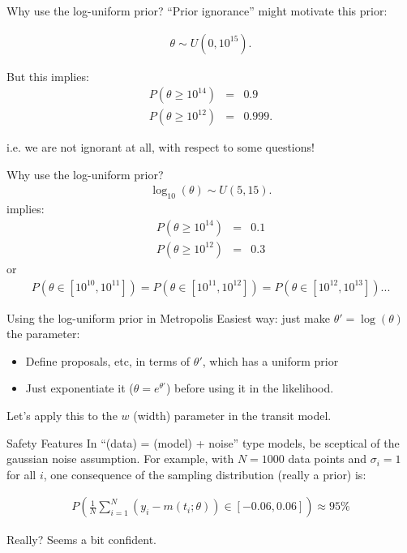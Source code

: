 \begin{frame}[t]{Why use the log-uniform prior?}
``Prior ignorance'' might motivate this prior:

\begin{eqnarray*}
\theta \sim U(0, 10^{15}).
\end{eqnarray*}

But this implies:
\begin{eqnarray*}
P(\theta \geq 10^{14}) &=& 0.9\\
P(\theta \geq 10^{12}) &=& 0.999.
\end{eqnarray*}

i.e. we are not ignorant at all, with respect to some questions!

\end{frame}

\begin{frame}[t]{Why use the log-uniform prior?}
\begin{eqnarray*}
\log_{10}(\theta) \sim U(5, 15).
\end{eqnarray*}
implies:
\begin{eqnarray*}
P(\theta \geq 10^{14}) &=& 0.1\\
P(\theta \geq 10^{12}) &=& 0.3
\end{eqnarray*}
or
\begin{eqnarray*}
P(\theta \in [10^{10}, 10^{11}]) = P(\theta \in [10^{11}, 10^{12}])
= P(\theta \in [10^{12}, 10^{13}]) ...
\end{eqnarray*}
\end{frame}

\begin{frame}[t]{Using the log-uniform prior in Metropolis}
Easiest way: just make $\theta' = \log(\theta)$ the parameter:

\begin{itemize}
\item Define proposals, etc, in terms of $\theta'$, which has a uniform prior
\item Just exponentiate it ($\theta = e^{\theta'}$) before using it in the likelihood.
\end{itemize}

Let's apply this to the $w$ (width) parameter in the transit model.
\end{frame}

\begin{frame}[t]{Safety Features}
In ``(data) = (model) + noise'' type models, be sceptical of the gaussian
noise assumption. For example, with $N=1000$ data points and $\sigma_i=1$ for
all $i$, one consequence of the sampling distribution (really a prior) is:

\begin{eqnarray}
P\left(\frac{1}{N}\sum_{i=1}^N (y_i - m(t_i; \theta)) \in [-0.06, 0.06]\right)
\approx 95\% 
\end{eqnarray}

Really? Seems a bit confident.
\end{frame}

